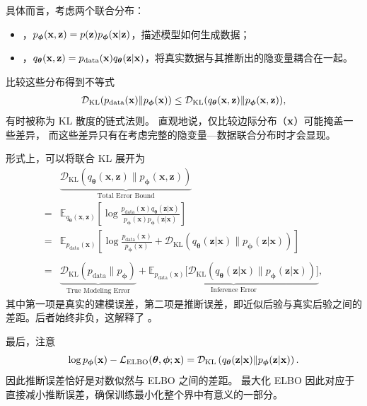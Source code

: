 具体而言，考虑两个联合分布：
\begin{itemize}
    \item {}，$p_{\bm{\phi}}({\mathbf{x}}, {\mathbf{z}}) = p({\mathbf{z}}) p_{\bm{\phi}}({\mathbf{x}}|{\mathbf{z}})$，描述模型如何生成数据；
    \item {}，$q_{\bm{\theta}}({\mathbf{x}}, {\mathbf{z}}) = p_{\text{data}}({\mathbf{x}}) q_{\bm{\theta}}({\mathbf{z}}|{\mathbf{x}})$，将真实数据与其推断出的隐变量耦合在一起。
\end{itemize}
比较这些分布得到不等式
\begin{align}\label{eq:joint-bound}
    \mathcal{D}_{\mathrm{KL}}(p_{\text{data}}({\mathbf{x}}) \| p_{\bm{\phi}}({\mathbf{x}})) 
    \leq \mathcal{D}_{\mathrm{KL}}(q_{\bm{\theta}}({\mathbf{x}},{\mathbf{z}}) \| p_{\bm{\phi}}({\mathbf{x}},{\mathbf{z}})),
\end{align}
有时被称为 KL 散度的链式法则。
直观地说，仅比较边际分布（${\mathbf{x}}$）可能掩盖一些差异，
而这些差异只有在考虑完整的隐变量—数据联合分布时才会显现。

形式上，可以将联合 KL 展开为
\begin{align*}
    &\underbrace{\mathcal{D}_{\mathrm{KL}}(q_{\bm{\theta}}(\mathbf{x}, \mathbf{z}) \| p_{\bm{\phi}}(\mathbf{x}, \mathbf{z}))}_{\text{Total Error Bound}} 
    \\=& \mathbb{E}_{q_{\bm{\theta}}(\mathbf{x}, \mathbf{z})} \left[ \log \frac{p_{\text{data}}(\mathbf{x}) q_{\bm{\theta}}(\mathbf{z}|\mathbf{x})}{p_{\bm{\phi}}(\mathbf{x}) p_{\bm{\phi}}(\mathbf{z}|\mathbf{x})} \right] \\=&\mathbb{E}_{p_{\text{data}}(\mathbf{x})} \left[ \log \frac{p_{\text{data}}(\mathbf{x})}{p_{\bm{\phi}}(\mathbf{x})} + \mathcal{D}_{\mathrm{KL}}\left( q_{\bm{\theta}}(\mathbf{z}|\mathbf{x}) \| p_{\bm{\phi}}(\mathbf{z}|\mathbf{x}) \right) \right] \\
    \\=&  \underbrace{\mathcal{D}_{\mathrm{KL}}(p_{\text{data}} \| p_{\bm{\phi}})}_{\text{True Modeling Error}} + \underbrace{\mathbb{E}_{p_{\text{data}}(\mathbf{x})} \big[ \mathcal{D}_{\mathrm{KL}}( q_{\bm{\theta}}(\mathbf{z}|\mathbf{x}) \| p_{\bm{\phi}}(\mathbf{z}|\mathbf{x}) ) \big]}_{\text{Inference Error}},
\end{align*}
其中第一项是真实的建模误差，第二项是推断误差，即近似后验与真实后验之间的差距。后者始终非负，这解释了 。

最后，注意
\[
\log p_{\bm{\phi}}({\mathbf{x}}) - \mathcal{L}_{\text{ELBO}}(\bm{\theta},\bm{\phi};{\mathbf{x}}) 
= \mathcal{D}_{\mathrm{KL}} \left(q_{\bm{\theta}}({\mathbf{z}}|{\mathbf{x}})\|p_{\bm{\phi}}({\mathbf{z}}|{\mathbf{x}})\right).
\]
因此推断误差恰好是对数似然与 ELBO 之间的差距。
最大化 ELBO 因此对应于直接减小推断误差，确保训练最小化整个界中有意义的一部分。




